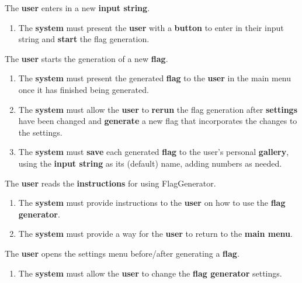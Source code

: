 \documentclass[12pt, titlepage]{article}
\begin{document}
\begin{enumerate}[label=BE\arabic*.]
    \begin{item}
        The \textbf{user} enters in a new \textbf{input string}.
        \begin{enumerate}[label=FR\arabic*., resume*=frs]
            \item The \textbf{system} must present the \textbf{user} with a \textbf{button} to enter in their input string and \textbf{start} the flag generation.
        \end{enumerate}
    \end{item}

    \begin{item}
        The \textbf{user} starts the generation of a new \textbf{flag}.
        \begin{enumerate}[label=FR\arabic*., resume*=frs]
            \item The \textbf{system} must present the generated \textbf{flag} to the \textbf{user} in the main menu once it has finished being generated.

            \item The \textbf{system} must allow the \textbf{user} to \textbf{rerun} the flag generation after \textbf{settings} have been changed and \textbf{generate} a new flag that incorporates the changes to the settings.

            \item The \textbf{system} must \textbf{save} each generated \textbf{flag} to the user’s personal \textbf{gallery}, using the \textbf{input string} as its (default) name, adding numbers as needed.
        \end{enumerate}
    \end{item}

    \begin{item}
        The \textbf{user} reads the \textbf{instructions} for using FlagGenerator.
        \begin{enumerate}[label=FR\arabic*., resume*=frs]
            \item The \textbf{system} must provide instructions to the \textbf{user} on how to use the \textbf{flag generator}.

            \item The \textbf{system} must provide a way for the \textbf{user} to return to the \textbf{main menu}.
        \end{enumerate}
    \end{item}

    \begin{item}
        The \textbf{user} opens the settings menu before/after generating a \textbf{flag}.
        \begin{enumerate}[label=FR\arabic*., resume*=frs]
            \item The \textbf{system} must allow the \textbf{user} to change the \textbf{flag generator} settings.


\end{enumerate}
\end{item}
\end{enumerate}
\end{document}
